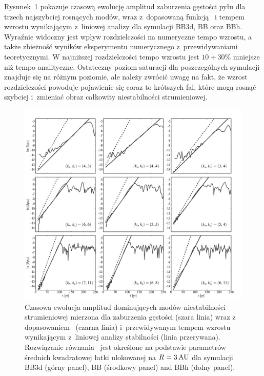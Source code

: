 \par Rysunek~\ref{fig8} pokazuje czasową ewolucję amplitud zaburzenia gęstości
pyłu dla trzech najszybciej rosnących modów, wraz z~dopasowaną funkcją~
i tempem wzrostu wynikającym z~liniowej analizy dla symulacji BB3d, BB oraz BBh.
Wyraźnie widoczny jest wpływ rozdzielczości na numeryczne tempo wzrostu, a także
zbieżność wyników eksperymentu numerycznego z~przewidywaniami teoretycznymi. W
najniższej rozdzielczości tempo wzrostu jest $10\div30\%$ mniejsze niż tempo
analityczne. Ostateczny poziom saturacji dla poszczególnych symulacji znajduje
się na różnym poziomie, ale należy zwrócić uwagę na fakt, że wzrost
rozdzielczości powoduje pojawienie się coraz to krótszych fal, które mogą rosnąć
szybciej i~zmieniać obraz całkowity niestabilności strumieniowej.
 
\begin{figure} \includegraphics[width=0.98\linewidth]{figures/fig8}
   \caption[Ewolucja dominujących modów niestabilności strumieniowej.]
     {Czasowa ewolucja amplitud dominujących modów niestabilności
      strumieniowej mierzona dla zaburzenia gęstości (szara linia) wraz z
      dopasowaniem~ (czarna linia) i~przewidywanym tempem wzrostu
      wynikającym z~liniowej analizy stabilności (linia przerywana).
      Rozwiązanie równania~ jest określone na podstawie
      parametrów średnich kwadratowej łatki ulokowanej na $R=3\hbox{$\thinspace\textrm{AU}$}$ dla symulacji
BB3d (górny panel), BB (środkowy panel) and BBh (dolny panel).  } \label{fig8}
\end{figure}

